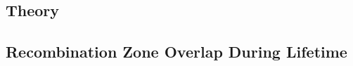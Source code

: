 \documentclass[../thesis.tex]{subfiles}
\begin{document}
\subsection{Theory}

\subsection{Recombination Zone Overlap During Lifetime}




\end{document}
